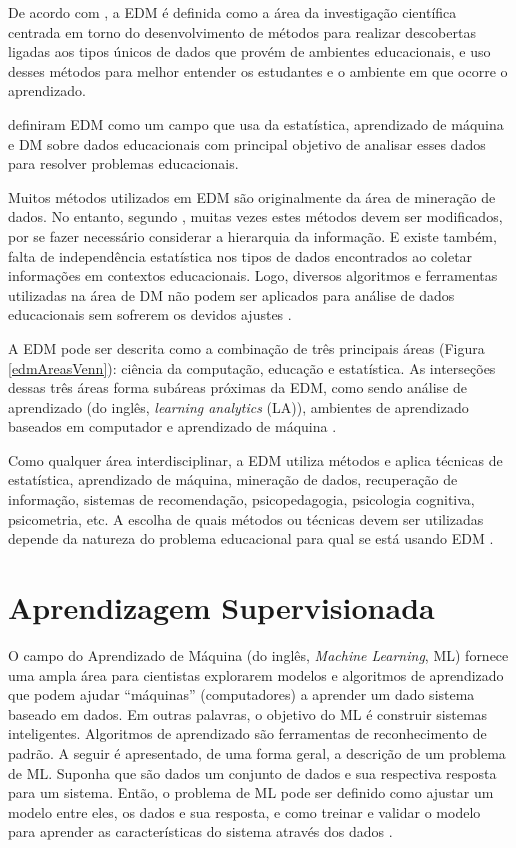 De acordo com , a EDM é definida como a área da
investigação científica centrada em torno do desenvolvimento de métodos para
realizar descobertas ligadas aos tipos únicos de dados que provém de ambientes
educacionais, e uso desses métodos para melhor entender os estudantes e o
ambiente em que ocorre o aprendizado.

 definiram EDM como um campo que usa da
estatística, aprendizado de máquina e DM sobre dados educacionais com principal
objetivo de analisar esses dados  para resolver problemas educacionais.

Muitos métodos utilizados em EDM são originalmente da área de mineração de
dados. No entanto, segundo , muitas vezes estes
métodos devem ser modificados, por se fazer necessário considerar a hierarquia
da informação. E existe também, falta de independência estatística nos tipos de
dados encontrados ao coletar informações em contextos educacionais. Logo,
diversos algoritmos e ferramentas utilizadas na área de DM não podem ser
aplicados para análise de dados educacionais sem sofrerem os devidos ajustes
\cite{baker2011mineraccao,costa2012mineraccao}.

A EDM pode ser descrita como a combinação de três principais áreas (Figura
\ref{edmAreasVenn}): ciência da computação, educação e estatística. As
interseções dessas três áreas forma subáreas próximas da EDM, como sendo análise
de aprendizado (do inglês, \textit{learning analytics} (LA)), ambientes de
aprendizado baseados em computador e aprendizado de máquina
\cite{romero2013data}.


Como qualquer área interdisciplinar, a EDM utiliza métodos e aplica técnicas de
estatística, aprendizado de máquina, mineração de dados, recuperação de
informação, sistemas de recomendação, psicopedagogia, psicologia cognitiva,
psicometria, etc. A escolha de quais métodos ou técnicas devem ser utilizadas
depende da natureza do problema educacional para qual se está usando EDM
\cite{bousbia2014contribution}.

\section{Aprendizagem Supervisionada}

O campo do Aprendizado de Máquina (do inglês, \textit{Machine Learning}, ML)
fornece uma ampla área para cientistas explorarem modelos e algoritmos de
aprendizado que podem ajudar ``máquinas'' (computadores) a aprender um dado
sistema baseado em dados. Em outras palavras, o objetivo do ML é construir
sistemas inteligentes. Algoritmos de aprendizado são ferramentas de
reconhecimento de padrão. A seguir é apresentado, de uma forma geral, a
descrição de um problema de ML. Suponha que são dados um conjunto de dados e sua
respectiva resposta para um sistema. Então, o problema de ML pode ser definido
como ajustar um modelo entre eles, os dados e sua resposta, e como treinar e
validar o modelo para aprender as características do sistema através dos dados
\cite{suthaharan2016machine}.

